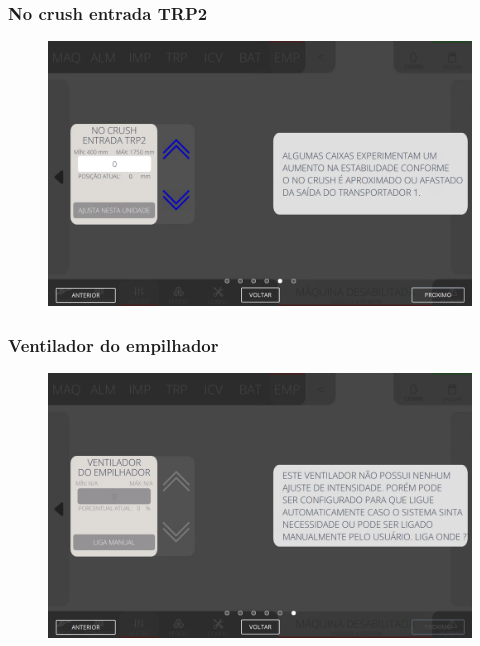 \newpage
\thispagestyle{fancy}
\vspace*{40 pt}
\subsubsection{\small{No crush entrada TRP2}} \label{sec:telaAjustesEmpilhadorNoCrushEntradaTRP2}
\vspace*{\fill}
\begin{figure}[h]
    \centering
    \includegraphics[width=576 px,height=360 px]{src/imagesICV/08-stacker/settings/11.png}
\end{figure}
\vspace*{\fill}

\newpage
\thispagestyle{fancy}
\vspace*{40 pt}
\subsubsection{\small{Ventilador do empilhador}} \label{sec:telaAjustesEmpilhadorVentiladorEmpilhador}
\vspace*{\fill}
\begin{figure}[h]
    \centering
    \includegraphics[width=576 px,height=360 px]{src/imagesICV/08-stacker/settings/12.png}
\end{figure}
\vspace*{\fill}

